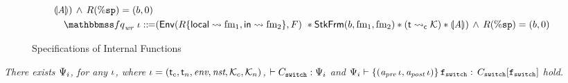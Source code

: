 \begin{figure}[!t]
\[\begin{array}{l}
            \safePrimAst{\primcom}) \, \land \, \RFile(\spreg) = (\block, 0) \\
            \\[-9pt]
            \quad
            \relspecpost_{\textit{wr}} \ \lgvl \define 
            (\Env{\RFile\{ \localRN \rightsquigarrow \fm_1, \inRN \rightsquigarrow \fm_2 \}, \Wstack} \
            \sepstar \RelStkFm{\block}{\fm_1}{\fm_2} 
            \sepstar (\astCurCont{\thrdid}{\hthrdlocalst}) \sepstar 
            \safePrimAst{\primcom}) 
            \, \land \, \RFile(\spreg) = (\block, 0) 
        \end{array}
    \]
    \caption{Specifications of Internal Functions}
    \label{fig:Specifications of Internal Functions}
\end{figure}

\begin{lemma}
    \em
    \label{lemma:codeproof}
    There exists $\Psi_i$, for any $\iota$,
    where $\iota = (\textsf{t}_c, \textsf{t}_n, \textit{env}, \textit{nst}, \mathcal{K}_c, 
    \mathcal{K}_n)$,
    $\vdash {C_{\texttt{switch}}} : {\Psi_i}$ and 
    ${\Psi_i} \vdash \{ ({\textit{a}_\textit{pre} \, \iota}, {\textit{a}_\textit{post} \, \iota}) \} \, {\texttt{f}_{\texttt{switch}}} : \, {C_{\texttt{switch}}[\texttt{f}_{\texttt{switch}}]}$ hold. 
\end{lemma}

